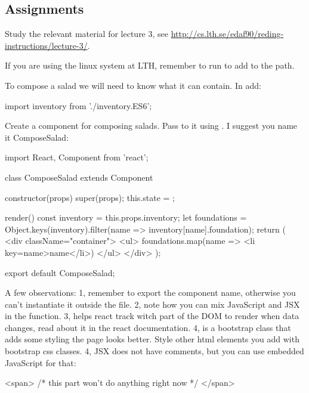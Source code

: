 \documentclass[fleqn, article, a4paper]{memoir}
\begin{document}
\subsection*{Assignments}

\begin{Assignments}

\item Study the relevant material for lecture 3, see \url{http://cs.lth.se/edaf90/reding-instructions/lecture-3/}. 

\item If you are using the linux system at LTH, remember to run  to add  to the path.

\item To compose a salad we will need to know what it can contain. In  add:
\begin{Code}
import inventory from './inventory.ES6';
\end{Code}

\item Create a component for composing salads. Pass  to it using . I suggest you name it ComposeSalad:
\begin{Code}
import React, { Component } from 'react';

class ComposeSalad extends Component {
  constructor(props) {
    super(props);
    this.state = {};
  }

  render() {
    const inventory = this.props.inventory;
    let foundations = Object.keys(inventory).filter(name => inventory[name].foundation);
    return (
      <div className="container">
        <ul>
          {foundations.map(name => <li key={name}>{name}</li>)}
        </ul>
      </div>
    );
  }
}

export default ComposeSalad;
\end{Code}

A few observations: 1, remember to export the component name, otherwise you can't instantiate it outside the file. 2, note how you can mix JavaScript and JSX in the  function. 3,  helps react track witch part of the DOM to render when data changes, read about it in the react documentation. 4,  is a bootstrap class that adds some styling the page looks better. Style other html elements you add with bootstrap css classes. 4, JSX does not have comments, but you can use embedded JavaScript for that:
\begin{Code}
<span>
  {/* this part won't do anything right now */}
</span>
\end{Code}


\end{Assignments}
\end{document}
